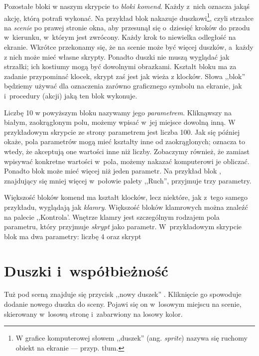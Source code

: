 \documentclass{report}
\begin{document}
Pozostałe bloki w naszym skrypcie to \emph{bloki komend}. Każdy z~nich oznacza jakąś akcję, którą \Snap{} potrafi wykonać. Na przykład blok  nakazuje duszkowi\footnote{W grafice komputerowej słowem ,,duszek'' (ang. \textit{sprite}) nazywa się ruchomy obiekt na ekranie --- przyp. tłum.}, czyli strzałce na \emph{scenie} po prawej stronie okna, aby przesunął się o~dziesięć kroków do przodu w~kierunku, w~którym jest zwrócony. Każdy krok to niewielka odległość na ekranie. Wkrótce przekonamy się, że na scenie może być więcej duszków, a~każdy z nich może mieć własne skrypty. Ponadto duszki nie muszą wyglądać jak strzałki; ich kostiumy mogą być dowolnymi obrazkami. Kształt bloku  ma za zadanie przypominać klocek, skrypt zaś jest jak wieża z klocków. Słowa ,,blok'' będziemy używać dla oznaczenia zarówno graficznego symbolu na ekranie, jak i~procedury (akcji) jaką ten blok wykonuje.

Liczbę 10 w powyższym bloku  nazywamy jego \emph{parametrem}. Kliknąwszy na białym, zaokrąglonym polu, możemy wpisać w~jej miejsce dowolną inną. W przykładowym skrypcie ze strony \pageref{fig:typowy-skrypt} parametrem jest liczba 100. Jak się później okaże, pola parametrów mogą mieć kształty inne od zaokrąglonych; oznacza to wtedy, że akceptują one wartości inne niż liczby. Zobaczymy również, że zamiast wpisywać konkretne wartości w~pola, możemy nakazać komputerowi je obliczać. Ponadto blok może mieć więcej niż jeden parametr. Na przykład blok , znajdujący się mniej więcej w~połowie palety ,,Ruch'', przyjmuje trzy parametry.

Większość bloków komend ma kształt klocków, lecz niektóre, jak  z~tego samego przykładu, wyglądają jak \emph{klamry}. Większość bloków klamrowych można znaleźć na palecie ,,Kontrola'. Wnętrze klamry jest szczególnym rodzajem pola parametru, który przyjmuje \emph{skrypt} jako parametr. W~przykładowym skrypcie blok  ma dwa parametry: liczbę 4 oraz skrypt


\section{Duszki i~współbieżność}

Tuż pod sceną znajduje się przycisk ,,nowy duszek'' . Kliknięcie go spowoduje dodanie nowego duszka do sceny. Pojawi się on w~losowym miejscu na scenie, skierowany w~losową stronę i~zabarwiony na losowy kolor.
\end{document}
